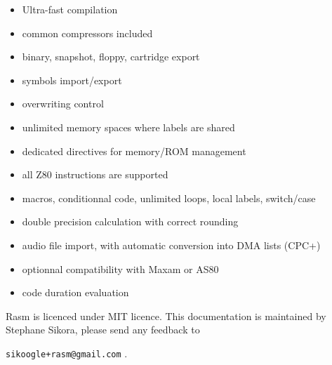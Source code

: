 \begin{xen}
\begin{itemize}[noitemsep]
\item Ultra-fast compilation
\item common compressors included
\item binary, snapshot, floppy, cartridge export
\item symbols import/export
\item overwriting control
\item unlimited memory spaces where labels are shared
\item dedicated directives for memory/ROM management
\item all Z80 instructions are supported
\item macros, conditionnal code, unlimited loops, local labels, switch/case
\item double precision calculation with correct rounding
\item audio file import, with automatic conversion into DMA lists (CPC+)
\item optionnal compatibility with Maxam or AS80
\item code duration evaluation
\end{itemize}

Rasm is licenced under MIT licence. 
\medbreak
This documentation is maintained by Stephane Sikora, please send any feedback to

\texttt{sikoogle+rasm@gmail.com} .

\end{xen}

